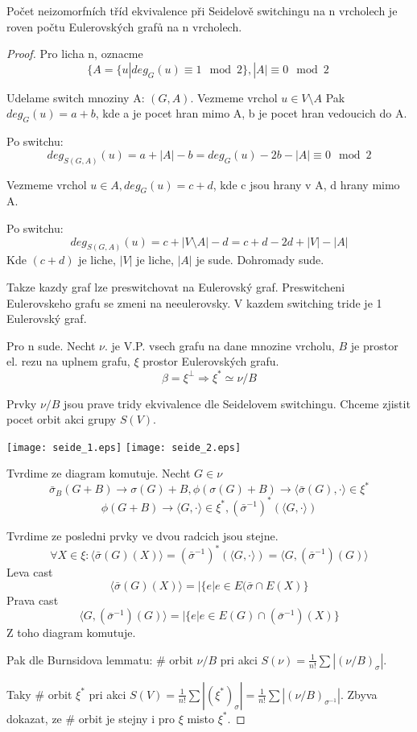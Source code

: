 \begin{theorem}
Počet neizomorfních tříd ekvivalence při Seidelově switchingu na n vrcholech je roven počtu Eulerovských grafů na n vrcholech.
\end{theorem}
\begin{proof}
Pro licha n, oznacme
\[ \{ A = \{ u | deg_G(u) \equiv 1 \mod2 \}, |A| \equiv 0 \mod2\ \]

	Udelame switch mnoziny A: $(G,A)$. Vezmeme vrchol $u \in V\setminus A$
	Pak $deg_G(u) = a + b$, kde a je pocet hran mimo A, b je pocet hran vedoucich do A.

	Po switchu:
	\[ deg_{S(G,A)}(u) = a + |A| - b = deg_G(u) - 2b - |A| \equiv 0 \mod2 \]

	Vezmeme vrchol $u \in A, deg_G(u) = c + d$, kde c jsou hrany v A, d hrany mimo A.

	Po switchu:
	\[ deg_{S(G,A)}(u) = c + |V \setminus A| - d = c + d - 2d + |V| - |A|\]
	Kde $(c + d)$ je liche, $|V|$ je liche, $|A|$ je sude. Dohromady sude.

	Takze kazdy graf lze preswitchovat na Eulerovský graf. Preswitcheni Eulerovskeho grafu se zmeni na neeulerovsky. V kazdem switching tride je 1 Eulerovský graf.

	Pro n sude. Necht $\nu$. je V.P. vsech grafu na dane mnozine vrcholu, $B$ je prostor el. rezu na uplnem grafu, $\xi$ prostor Eulerovských grafu.
	\[ \beta = \xi^{\perp} \Rightarrow \xi^{\ast} \simeq \nu/B \]

	Prvky $\nu/B$ jsou prave tridy ekvivalence dle Seidelovem switchingu. Chceme zjistit pocet orbit akci grupy $S(V)$.

	\texttt{[image: seide\_1.eps]}
	\texttt{[image: seide\_2.eps]}

	Tvrdime ze diagram komutuje. Necht $G \in \nu$
	\[ \bar{\sigma}_B(G + B) \to \sigma(G) + B, \phi(\sigma(G) + B) \to \langle \bar{\sigma}(G), \cdot \rangle \in \xi^{\ast} \]
	\[ \phi(G + B) \to \langle G, \cdot \rangle \in \xi^{\ast}, (\bar{\sigma}^{-1})^{\ast}(\langle G, \cdot \rangle) \]

	Tvrdime ze posledni prvky ve dvou radcich jsou stejne.
	\[ \forall X \in \xi: \langle \bar{\sigma}(G)(X) \rangle = (\bar{\sigma}^{-1})^{\ast}(\langle G, \cdot \rangle) = \langle G, (\bar{\sigma}^{-1})(G) \rangle \]
	Leva cast
	\[ \langle \bar{\sigma}(G)(X) \rangle = |\{ e | e \in E(\bar{\sigma} \cap E(X) \} \]
	Prava cast
	\[ \langle G, (\bar{\sigma}^{-1})(G) \rangle = |\{ e | e \in E(G) \cap (\bar{\sigma}^{-1})(X) \} \]
	Z toho diagram komutuje.

	Pak dle Burnsidova lemmatu: \# orbit $\nu/B$ pri akci $S(\nu) = \frac{1}{n!} \sum |(\nu/B)_{\sigma}|$.

	Taky \# orbit $\xi^{\ast}$ pri akci $S(V) = \frac{1}{n!} \sum |(\xi^{\ast})_{\sigma}| = \frac{1}{n!} \sum |(\nu/B)_{\sigma^{-1}}|$.
	Zbyva dokazat, ze \# orbit je stejny i pro $\xi$ misto $\xi^{\ast}$.

\end{proof}
